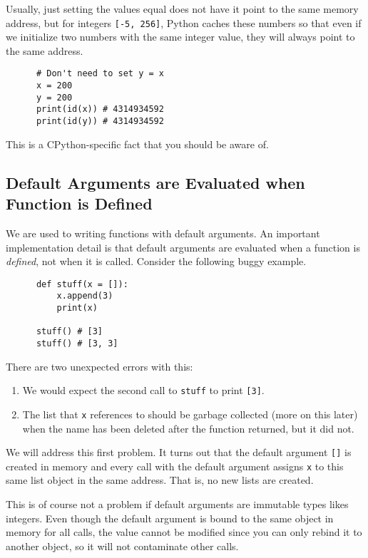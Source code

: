 \documentclass{article}
\begin{document}
    Usually, just setting the values equal does not have it point to the same memory address, but for integers \texttt{[-5, 256]}, Python caches these numbers so that even if we initialize two numbers with the same integer value, they will always point to the same address. 

    \begin{lstlisting}
      # Don't need to set y = x
      x = 200 
      y = 200 
      print(id(x)) # 4314934592 
      print(id(y)) # 4314934592
    \end{lstlisting}

    This is a CPython-specific fact that you should be aware of. 

  \subsection{Default Arguments are Evaluated when Function is Defined}

    We are used to writing functions with default arguments. An important implementation detail is that default arguments are evaluated when a function is \textit{defined}, not when it is called. Consider the following buggy example. 

    \begin{lstlisting}
      def stuff(x = []): 
          x.append(3)
          print(x)

      stuff() # [3]
      stuff() # [3, 3]
    \end{lstlisting}

    There are two unexpected errors with this: 
    \begin{enumerate}
      \item We would expect the second call to \texttt{stuff} to print \texttt{[3]}. 
      \item The list that \texttt{x} references to should be garbage collected (more on this later) when the name has been deleted after the function returned, but it did not. 
    \end{enumerate}

    We will address this first problem. It turns out that the default argument \texttt{[]} is created in memory and every call with the default argument assigns \texttt{x} to this same list object in the same address. That is, no new lists are created. 

    This is of course not a problem if default arguments are immutable types likes integers. Even though the default argument is bound to the same object in memory for all calls, the value cannot be modified since you can only rebind it to another object, so it will not contaminate other calls. 
\end{document}
